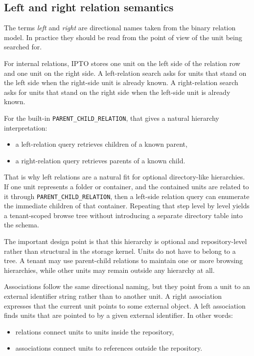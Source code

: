 \subsection{Left and right relation semantics}

The terms \emph{left} and \emph{right} are directional names taken from the binary relation model. In practice they should be read from the point of view of the unit being searched for.

For internal relations, IPTO stores one unit on the left side of the relation row and one unit on the right side. A left-relation search asks for units that stand on the left side when the right-side unit is already known. A right-relation search asks for units that stand on the right side when the left-side unit is already known.

For the built-in \texttt{PARENT\_CHILD\_RELATION}, that gives a natural hierarchy interpretation:
\begin{itemize}
\item a left-relation query retrieves children of a known parent,
\item a right-relation query retrieves parents of a known child.
\end{itemize}

That is why left relations are a natural fit for optional directory-like hierarchies. If one unit represents a folder or container, and the contained units are related to it through \texttt{PARENT\_CHILD\_RELATION}, then a left-side relation query can enumerate the immediate children of that container. Repeating that step level by level yields a tenant-scoped browse tree without introducing a separate directory table into the schema.

The important design point is that this hierarchy is optional and repository-level rather than structural in the storage kernel. Units do not have to belong to a tree. A tenant may use parent-child relations to maintain one or more browsing hierarchies, while other units may remain outside any hierarchy at all.

Associations follow the same directional naming, but they point from a unit to an external identifier string rather than to another unit. A right association expresses that the current unit points to some external object. A left association finds units that are pointed to by a given external identifier. In other words:
\begin{itemize}
\item relations connect units to units inside the repository,
\item associations connect units to references outside the repository.
\end{itemize}

